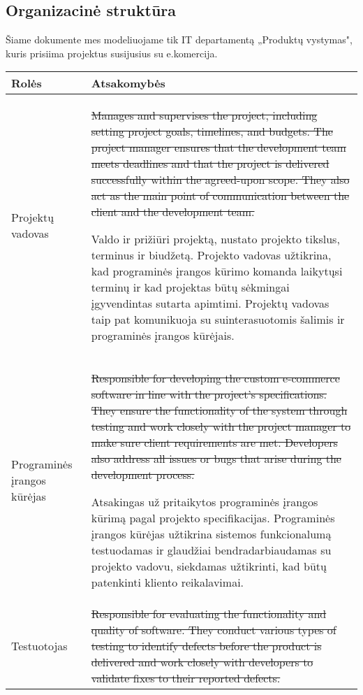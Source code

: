 \subsection{Organizacinė struktūra}
Šiame dokumente mes modeliuojame tik IT departamentą „Produktų vystymas", kuris prisiima projektus susijusius su e.komercija.
\begin{table}[h!]
\centering
\begin{tabular}{p{}|p{}}
\hline
\textbf{Rolės} & \textbf{Atsakomybės} \\ \hline



Projektų vadovas & \st{Manages and supervises the project, including setting project goals, timelines, and budgets. The project manager ensures that the development team meets deadlines and that the project is delivered successfully within the agreed-upon scope. They also act as the main point of communication between the client and the development team.}

Valdo ir prižiūri projektą, nustato projekto tikslus, terminus ir biudžetą. Projekto vadovas užtikrina, kad programinės įrangos kūrimo  komanda laikytųsi terminų ir kad projektas būtų sėkmingai įgyvendintas sutarta apimtimi. Projektų vadovas taip pat komunikuoja su suinterasuotomis šalimis ir programinės įrangos kūrėjais.

\\ \hline
Programinės įrangos kūrėjas & \st{ Responsible for developing the custom e-commerce software in line with the project's specifications. They ensure the functionality of the system through testing and work closely with the project manager to make sure client requirements are met. Developers also address all issues or bugs that arise during the development process. }

Atsakingas už pritaikytos programinės įrangos kūrimą pagal projekto specifikacijas. Programinės įrangos kūrėjas užtikrina sistemos funkcionalumą testuodamas ir glaudžiai bendradarbiaudamas su projekto vadovu, siekdamas užtikrinti, kad būtų patenkinti kliento reikalavimai.
\\ \hline

Testuotojas & \st{Responsible for evaluating the functionality and quality of software. They conduct various types of testing to identify defects before the product is delivered and work closely with developers to validate fixes to their reported defects. }



\end{tabular}
\end{table}
